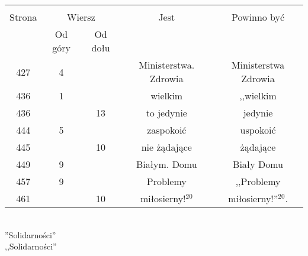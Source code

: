 \documentclass[a4paper,11pt]{article}
\begin{document}
\begin{center}
  \begin{tabular}{|c|c|c|c|c|}
    \hline
    & \multicolumn{2}{c|}{} & & \\
    Strona & \multicolumn{2}{c|}{Wiersz} & Jest
                              & Powinno być \\ \cline{2-3}
    & Od góry & Od dołu & & \\
    \hline
    427 &  4 & & Ministerstwa. Zdrowia & Ministerstwa Zdrowia \\
    436 &  1 & & wielkim & ,,wielkim  %
    \\
    436 & & 13 & to jedynie & jedynie \\
    444 &  5 & & zaspokoić & uspokoić \\
    445 & & 10 & nie żądające & żądające \\
    449 &  9 & & Białym. Domu & Biały Domu \\
    457 &  9 & & Problemy & ,,Problemy  %
    \\
    461 & & 10 & miłosierny!$^{ 20 }$ & miłosierny!''$^{ 20 }$. \\
    \hline
  \end{tabular}
\end{center}
\noi
{} \\
\Jest ''Solidarności'' \\
\Pow  ,,Solidarności'' \\
 \\
\Jest {} \\
\Pow  {} \\
 \\
\Jest {} \\
\Pow  {} \\

\vspace{\spaceTwo}





\newpage
{}

\vspace{\spaceTwo} \vspace{\spaceThree}
\end{document}

